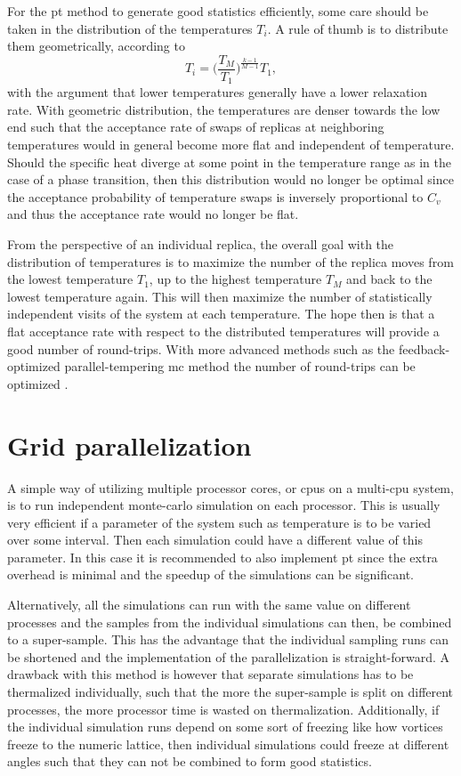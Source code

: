 For the \ac{pt} method to generate good statistics efficiently, some care should be taken in the distribution of the temperatures $T_i$.
A rule of thumb is to distribute them geometrically, \ie according to
\begin{equation}
    \label{eq:Monte:PT:geometricTemperatures}
    T_i = \bigg(\frac{T_M}{T_1}\bigg)^{\frac{k-1}{M-1}}T_1,
\end{equation}
with the argument that lower temperatures generally have a lower relaxation rate. With geometric distribution, the temperatures are denser towards
the low end such that the acceptance rate of swaps of replicas at neighboring temperatures would in general become more flat and independent of temperature.
Should the specific heat diverge at some point in the temperature range as in the case of a phase transition, then this distribution would no
longer be optimal since the acceptance probability of temperature swaps is inversely proportional to $C_v$ and thus the acceptance rate would no
longer be flat.

From the perspective of an individual replica, the overall goal with the distribution of temperatures is to maximize the number of the replica moves
from the lowest temperature $T_1$, up to the highest temperature $T_M$ and back to the lowest temperature again. This will then maximize the number
of statistically independent visits of the system at each temperature. The hope then is that a flat acceptance rate with respect to the distributed
temperatures will provide a good number of round-trips. With more advanced methods such as the feedback-optimized parallel-tempering \ac{mc}
method the number of round-trips can be optimized \cite{Katzgraber06}.

\section{Grid parallelization}

A simple way of utilizing multiple processor cores, or cpus on a multi-cpu system, is to run independent monte-carlo simulation on each processor. This
is usually very efficient if a parameter of the system such as temperature is to be varied over some interval. Then each simulation could have a
different value of this parameter. In this case it is recommended to also implement \ac{pt} since the extra overhead is minimal and the
speedup of the simulations can be significant.

Alternatively, all the simulations can run with the same value on different processes and the samples from the individual simulations can then,
be combined to a super-sample. This has the advantage that the individual sampling runs can be shortened and the implementation of the parallelization
is straight-forward. A drawback with this method is however that separate simulations has to be thermalized individually, such that the more the
super-sample is split on different processes, the more processor time is wasted on thermalization. Additionally, if the individual simulation
runs depend on some sort of freezing like how vortices freeze to the numeric lattice, then individual simulations could freeze at different
angles such that they can not be combined to form good statistics.

